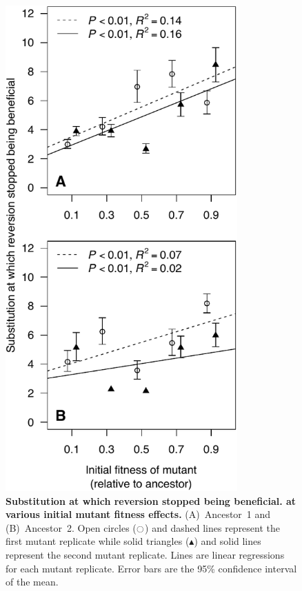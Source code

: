 \begin{doublespace}
\begin{figure}
\begin{center}
\includegraphics[width=3.5in]{first-mut-rev-bad-W.pdf}
\end{center}
\caption{{\bf Substitution at which reversion stopped being beneficial.
  at various initial mutant fitness effects.}
  (A)~Ancestor~1 and (B)~Ancestor~2.
  Open circles ($\ocircle$) and dashed lines
  represent the first mutant replicate
  while solid triangles ($\blacktriangle$) and solid lines
  represent the second mutant replicate.
  Lines are linear regressions for each mutant replicate.
  Error bars are the 95\% confidence interval of the mean.}
\label{fig:first-mut-rev-bad-W}
\end{figure}




\end{doublespace}
